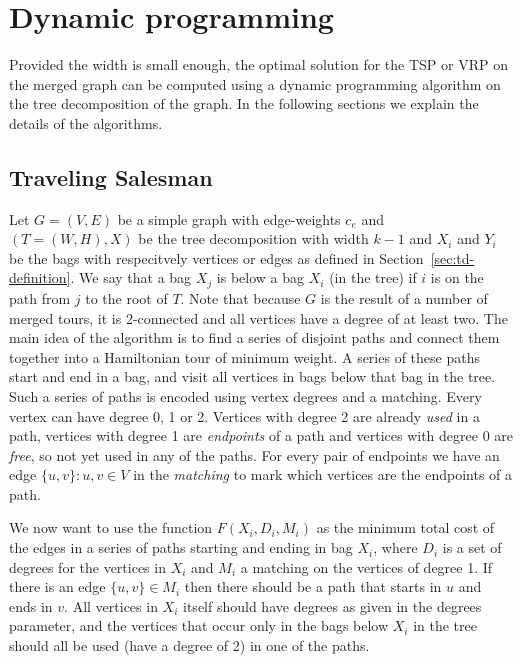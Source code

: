 \documentclass[titlepage, 12pt]{article}
\begin{document}
%
%
\section{Dynamic programming}
\label{sec:dp}
Provided the width is small enough, the optimal solution for the TSP or VRP on the merged graph can
be computed using a dynamic programming algorithm on the tree decomposition of the graph. In the
following sections we explain the details of the algorithms.

    \subsection{Traveling Salesman}
    \label{sec:dp-tsp}
    Let $G=(V, E)$ be a simple graph with edge-weights $c_e$ and $(T=(W, H), X)$ be the tree
    decomposition with width $k - 1$ and $X_i$ and $Y_i$ be the bags with respecitvely vertices or
    edges as defined in Section~\ref{sec:td-definition}. We say that a bag $X_j$ is below a bag
    $X_i$ (in the tree) if $i$ is on the path from $j$ to the root of $T$.
    Note that because $G$ is the result of a number of merged tours, it is 2-connected and all
    vertices have a degree of at least two.
    The main idea of the algorithm is to find a series of disjoint paths and connect them together
    into a Hamiltonian tour of minimum weight. A series of these paths start and end in a bag, and
    visit all vertices in bags below that bag in the tree. Such a series of paths is encoded using
    vertex degrees and a matching.  Every vertex can have degree 0, 1 or 2. Vertices with degree 2
    are already \emph{used} in a path, vertices with degree 1 are \emph{endpoints} of a path and
    vertices with degree 0 are \emph{free}, so not yet used in any of the paths. For every pair of
    endpoints we have an edge $\{u, v\}: u,v \in V$ in the \emph{matching} to mark which vertices
    are the endpoints of a path.

    We now want to use the function $F(X_i, D_i, M_i)$ as the minimum total cost of the edges in a
    series of paths starting and ending in bag $X_i$, where $D_i$ is a set of degrees for the
    vertices in $X_i$ and $M_i$ a matching on the vertices of degree 1. If there is an edge
    $\{u, v\} \in M_i$ then there should be a path that starts in $u$ and ends in $v$. All vertices
    in $X_i$ itself should have degrees as given in the degrees parameter, and the vertices that
    occur only in the bags below $X_i$ in the tree should all be used (have a degree of 2) in one of
    the paths.
\end{document}
